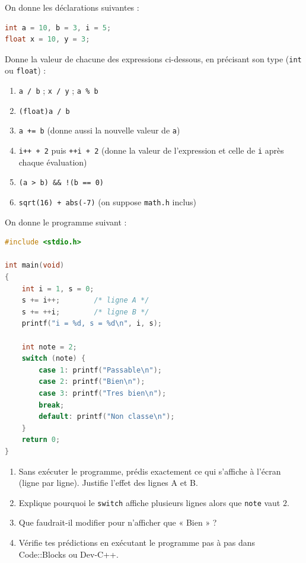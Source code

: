 \documentclass[11pt]{article}
\newcounter{popsec}
\newcounter{popsub}
\newcommand{\courssub}[1]{%
  \stepcounter{popsub}%
  \par\vspace{9pt}\noindent{\popxbold\fontsize{11.5}{13}\selectfont\color{popink}{\color{poporange}\thepopsec.\thepopsub}\hspace{6pt}#1}\par\nopagebreak\vspace{4pt}
}
\begin{document}
\begin{exercice}
On donne les déclarations suivantes :
\begin{lstlisting}[language=C]
int a = 10, b = 3, i = 5;
float x = 10, y = 3;
\end{lstlisting}
Donne la valeur de chacune des expressions ci-dessous, en précisant son type (\texttt{int} ou \texttt{float}) :
\begin{enumerate}
\item \texttt{a / b} \quad ; \quad \texttt{x / y} \quad ; \quad \texttt{a \% b}
\item \texttt{(float)a / b}
\item \texttt{a += b} (donne aussi la nouvelle valeur de \texttt{a})
\item \texttt{i++ + 2} puis \texttt{++i + 2} (donne la valeur de l'expression et celle de \texttt{i} après chaque évaluation)
\item \texttt{(a > b) \&\& !(b == 0)}
\item \texttt{sqrt(16) + abs(-7)} (on suppose \texttt{math.h} inclus)
\end{enumerate}
\end{exercice}

\courssub{Je m'entraîne}

\begin{exercice}
On donne le programme suivant :
\begin{lstlisting}[language=C]
#include <stdio.h>

int main(void)
{
    int i = 1, s = 0;
    s += i++;        /* ligne A */
    s += ++i;        /* ligne B */
    printf("i = %d, s = %d\n", i, s);

    int note = 2;
    switch (note) {
        case 1: printf("Passable\n");
        case 2: printf("Bien\n");
        case 3: printf("Tres bien\n");
        break;
        default: printf("Non classe\n");
    }
    return 0;
}
\end{lstlisting}
\begin{enumerate}
\item Sans exécuter le programme, prédis exactement ce qui s'affiche à l'écran (ligne par ligne). Justifie l'effet des lignes A et B.
\item Explique pourquoi le \texttt{switch} affiche plusieurs lignes alors que \texttt{note} vaut $2$.
\item Que faudrait-il modifier pour n'afficher que « Bien » ?
\item Vérifie tes prédictions en exécutant le programme pas à pas dans Code::Blocks ou Dev-C++.
\end{enumerate}
\end{exercice}
\end{document}
